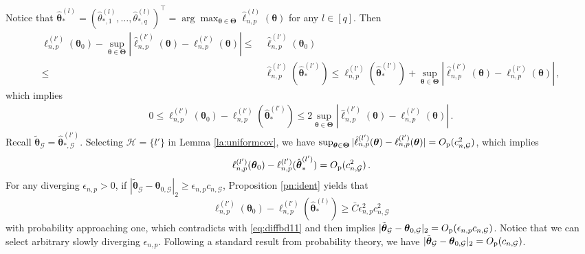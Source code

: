 \documentclass[12pt]{article}
\newcommand{\bTheta}{\boldsymbol \Theta}
\newcommand{\btheta}{\boldsymbol \theta}
\def\T{{\scriptscriptstyle \top} }
\newcommand{\0}{{\bf 0}}
\begin{document}
Notice that $
\hat{\btheta}_*^{(l)}=(\hat \theta_{*,1}^{(l)}, \dots,\hat \theta_{*,q}^{(l)} )^{\T}=\arg\max_{\btheta\in\bTheta}\hat{\ell}_{n,p}^{(l)}(\btheta)$ for any $l\in[q]$. Then
\begin{align*}
{\ell}_{n,p}^{(l')}(\btheta_0)-\sup_{\btheta\in\bTheta}|\hat{\ell}_{n,p}^{(l')}(\btheta)-{\ell}_{n,p}^{(l')}(\btheta)|\leq&~\hat{\ell}_{n,p}^{(l')}(\btheta_0)\\
\leq&~\hat{\ell}_{n,p}^{(l')}(\hat{\btheta}_*^{(l')})\leq {\ell}_{n,p}^{(l')}(\hat{\btheta}_*^{(l')})+\sup_{\btheta\in\bTheta}|\hat{\ell}_{n,p}^{(l')}(\btheta)-{\ell}_{n,p}^{(l')}(\btheta)|\,,
\end{align*}
which implies
\begin{align*}%
0\leq {\ell}_{n,p}^{(l')}(\btheta_0)-{\ell}_{n,p}^{(l')}(\hat{\btheta}_*^{(l')})\leq 2\sup_{\btheta\in\bTheta}|\hat{\ell}_{n,p}^{(l')}(\btheta)-{\ell}_{n,p}^{(l')}(\btheta)|\,.
\end{align*}
Recall $\tilde{\btheta}_{\mathcal{G}}=\hat{\btheta}_{*,\mathcal{G}}^{(l')}$. Selecting $\mathcal{H}=\{l'\}$ in Lemma \ref{la:uniformcov}, we have $\sup_{\btheta\in\bTheta}|\hat{\ell}_{n,p}^{(l')}(\btheta)-{\ell}_{n,p}^{(l')}(\btheta)|=O_{\rm p}(c_{n,\mathcal{G}}^2)$, which implies 
\begin{align}\label{eq:diffbd11}
{\ell}_{n,p}^{(l')}(\btheta_0)-{\ell}_{n,p}^{(l')}(\hat{\btheta}_*^{(l')})=O_{\rm p}(c_{n,\mathcal{G}}^2)\,.
\end{align}
For any diverging $\epsilon_{n,p}>0$, if $|\tilde{\btheta}_{\mathcal{G}}-\btheta_{0,\mathcal{G}}|_2\geq \epsilon_{n,p}c_{n,\mathcal{G}}$, Proposition \ref{pn:ident} yields that
\[
{\ell}_{n,p}^{(l')}(\btheta_0)-{\ell}_{n,p}^{(l')}(\hat{\btheta}_*^{(l)})\geq\bar{C}\epsilon_{n,p}^2c_{n,\mathcal{G}}^2 
\]
with probability approaching one, which contradicts with \eqref{eq:diffbd11} and then implies $|\tilde{\btheta}_{\mathcal{G}}-\btheta_{0,\mathcal{G}}|_2=O_{\rm p}( \epsilon_{n,p}c_{n,\mathcal{G}})$. Notice that we can select arbitrary slowly diverging $\epsilon_{n,p}$. Following a standard result from
probability theory, we have $|\tilde{\btheta}_{\mathcal{G}}-\btheta_{0,\mathcal{G}}|_2=O_{\rm p}(c_{n,\mathcal{G}})$. 
\end{document}
